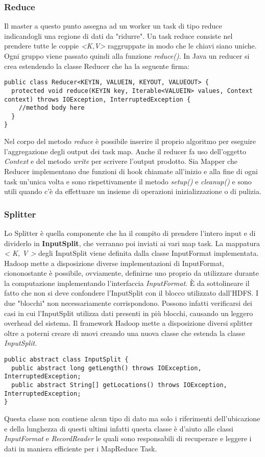 \subsubsection{Reduce}
Il master a questo punto assegna ad un worker un task di tipo reduce indicandogli una regione di dati da "ridurre". Un task reduce consiste nel prendere tutte le coppie \textit{<K,V>} raggruppate in modo che le chiavi siano uniche. Ogni gruppo viene passato quindi alla funzione \textit{reduce()}. In Java un reducer si crea estendendo la classe Reducer che ha la seguente firma:
\begin{lstlisting}
public class Reducer<KEYIN, VALUEIN, KEYOUT, VALUEOUT> {
  protected void reduce(KEYIN key, Iterable<VALUEIN> values, Context context) throws IOException, InterruptedException {
    //method body here
  }
}
\end{lstlisting}
Nel corpo del metodo \textit{reduce} è possibile inserire il proprio algoritmo per eseguire l'aggregazione degli output dei task map. Anche il reducer fa uso dell'oggetto \textit{Context} e del metodo \textit{write} per scrivere l'output prodotto. Sia Mapper che Reducer implementano due funzioni di hook chiamate all'inizio e alla fine di ogni task un'unica volta e sono rispettivamente il metodo \textit{setup()} e \textit{cleanup()} e sono utili quando c'è da effettuare un insieme di operazioni inizializzazione o di pulizia.
\subsubsection{Splitter}
Lo Splitter è quella componente che ha il compito di prendere l’intero input e di dividerlo in \textbf{InputSplit}, che verranno poi inviati ai vari map task. La mappatura \textit{< K, V >} degli InputSplit viene definita dalla classe InputFormat implementata. Hadoop mette a disposizione diverse implementazioni di InputFormat, ciononostante è possibile, ovviamente, definirne uno proprio da utilizzare durante la computazione implementando l’interfaccia \textit{InputFormat}. È da sottolineare il fatto che non si deve confondere l’InputSplit con il blocco utilizzato dall’HDFS. I due "blocchi" non necessariamente corrispondono. Possono infatti verificarsi dei casi in cui l’InputSplit utilizza dati presenti in più blocchi, causando un leggero overhead del sistema. Il framework Hadoop mette a disposizione diversi splitter oltre a poterni creare di nuovi creando una nuova classe che estenda la classe \textit{InputSplit}.
\begin{lstlisting}
public abstract class InputSplit {
  public abstract long getLength() throws IOException, InterruptedException;
  public abstract String[] getLocations() throws IOException, InterruptedException;
}
\end{lstlisting}
Questa classe non contiene alcun tipo di dato ma solo i riferimenti dell'ubicazione e della lunghezza di questi ultimi infatti questa classe è d'aiuto alle classi \textit{InputFormat} e \textit{RecordReader} le quali sono responsabili di recuperare e leggere i dati in maniera efficiente per i MapReduce Task.
